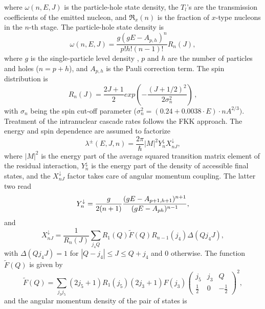 \noindent where $\omega (n,E,J)$ is the particle-hole state density,
the $T_{l}$'s are the transmission coefficients
of the emitted nucleon, and $\Re _{x}(n)$
is the fraction of $x$-type nucleons in the $n$-th stage. The particle-hole
state density is
\begin{equation}
\omega (n,E,J)=\frac{g(gE-A_{p,h})^{n}}{p!h!(n-1)!}R_{n}(J),
\end{equation}%
\noindent where $g$ is the single-particle level density%
, $p$ and $h$ are the number of particles and holes ($%
n=p+h$), and $A_{p,h}$ is the Pauli correction term. The spin distribution
is
\begin{equation}
R_{n}(J)=%
\frac{2J+1}{2}exp\left( -\frac{(J+1/2)^{2}}{2\sigma _{n}^{2}}\right)\,,
\end{equation}%
with $\sigma _{n}$ being the spin cut-off parameter ($\sigma
_{n}^{2}=(0.24+0.0038\cdot E)\cdot nA^{2/3}).$ Treatment of the intranuclear
cascade rates follows the FKK \cite{FKK} approach. The energy and spin
dependence are assumed to factorize
\begin{equation}
\lambda ^{\pm }(E,J,n)=\frac{2\pi }{\hbar }|M|^{2}Y_{n}^{\downarrow
}X_{nJ}^{\downarrow },
\end{equation}%
\noindent where $|M|^{2}$ is the energy part of the average squared
transition matrix element of the residual interaction, $Y_{n}^{\downarrow }$
is the energy part of the density of accessible final states, and the $%
X_{nJ}^{\downarrow }$ factor takes care of angular momentum coupling. The
latter two read
\begin{equation}
Y_{n}^{\downarrow }=\frac{g}{2(n+1)}\frac{(gE-A_{p+1,h+1})^{n+1}}{%
(gE-A_{ph})^{n-1}},
\end{equation}%
and
\begin{equation}
X_{nJ}^{\downarrow }=\frac{1}{R_{n}(J)}\sum_{j_{4}Q}R_{1}(Q)\widetilde{F}%
(Q)R_{n-1}(j_{4})\Delta (Qj_{4}J),
\end{equation}%
with $\Delta (Qj_{4}J)=1$ for $|Q-j_{4}|\leq J\leq Q+j_{4}$ and 0 otherwise.
The function $\widetilde{F}(Q)$ is given by
\begin{equation}
\widetilde{F}(Q)=\sum_{j_{3}j_{5}}(2j_{5}+1)R_{1}(j_{5})(2j_{3}+1)F(j_{3})%
\left(
\begin{array}{ccc}
j_{5} & j_{3} & Q \\
\frac{1}{2} & 0 & -\frac{1}{2}%
\end{array}%
\right) ^{2},
\end{equation}%
and the angular momentum density of the pair of states is
